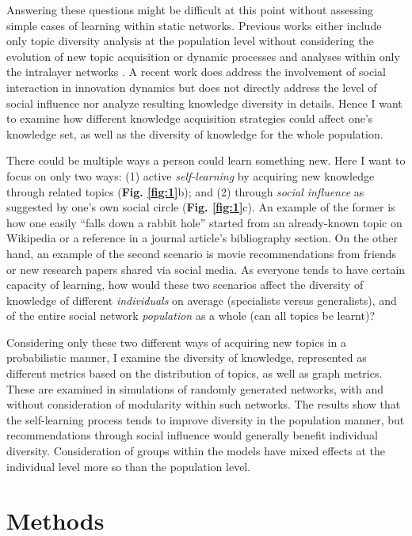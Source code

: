 \documentclass{svproc}
\begin{document}
Answering these questions might be difficult at this point without assessing simple cases of learning within static networks. Previous works either include only topic diversity analysis at the population level without considering the evolution of new topic acquisition \cite{Weng2015-zt} or dynamic processes and analyses within only the intralayer networks \cite{Sun2020-qj}. A recent work \cite{Iacopini2020-jm} does address the involvement of social interaction in innovation dynamics but does not directly address the level of social influence nor analyze resulting knowledge diversity in details. Hence I want to examine how different knowledge acquisition strategies could affect one's knowledge set, as well as the diversity of knowledge for the whole population.

There could be multiple ways a person could learn something new. Here I want to focus on only two ways: (1) active \textit{self-learning} by acquiring new knowledge through related topics  (\textbf{Fig. \ref{fig:1}}b); and (2) through \textit{social influence} as suggested by one's own social circle  (\textbf{Fig. \ref{fig:1}}c). An example of the former is how one easily ``falls down a rabbit hole'' started from an already-known topic on Wikipedia or a reference in a journal article's bibliography section. On the other hand, an example of the second scenario is movie recommendations from friends or new research papers shared via social media. As everyone tends to have certain capacity of learning, how would these two scenarios affect the diversity of knowledge of different \textit{individuals} on average (specialists versus generalists), and of the entire social network \textit{population} as a whole (can all topics be learnt)?

Considering only these two different ways of acquiring new topics in a probabilistic manner, I examine the diversity of knowledge, represented as different metrics based on the distribution of topics, as well as graph metrics. These are examined in simulations of randomly generated networks, with and without consideration of modularity within such networks. The results show that the self-learning process tends to improve diversity in the population manner, but recommendations through social influence would generally benefit individual diversity. Consideration of groups within the models have mixed effects at the individual level more so than the population level.

\section{Methods} \label{sec:method}
\end{document}
